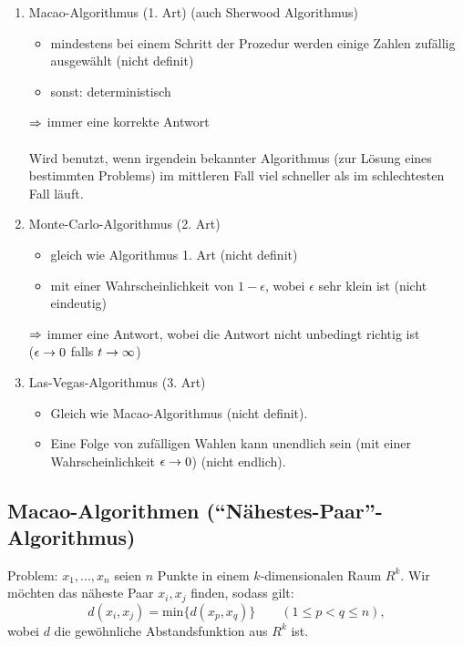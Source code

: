 \documentclass[a4paper]{scrartcl}
\begin{document}

\begin{enumerate}
\item{Macao-Algorithmus (1. Art)} (auch Sherwood Algorithmus)

\begin{itemize}
	\item mindestens bei einem Schritt der Prozedur werden einige Zahlen zufällig ausgewählt (nicht definit)
	\item sonst: deterministisch
\end{itemize}
$\Rightarrow$ immer eine korrekte Antwort\\ \\
Wird benutzt, wenn irgendein bekannter Algorithmus (zur Lösung eines bestimmten Problems) im mittleren Fall viel schneller als im schlechtesten Fall läuft.

\item{Monte-Carlo-Algorithmus (2. Art)}

\begin{itemize}
	\item gleich wie Algorithmus 1. Art (nicht definit)
	\item mit einer Wahrscheinlichkeit von $1-\epsilon$, wobei $\epsilon$ sehr klein ist (nicht eindeutig)
\end{itemize}
$\Rightarrow$ immer eine Antwort, wobei die Antwort nicht unbedingt richtig ist\\
($\epsilon \rightarrow 0$ falls $t \rightarrow \infty$)

\item{Las-Vegas-Algorithmus (3. Art)}
\begin{itemize}
	\item Gleich wie Macao-Algorithmus (nicht definit).
	\item Eine Folge von zufälligen Wahlen kann unendlich sein (mit einer Wahrscheinlichkeit $\epsilon \rightarrow 0$) (nicht endlich).
\end{itemize}
\end{enumerate}

\subsection{Macao-Algorithmen ("`Nähestes-Paar"'-Algorithmus)}

Problem: $x_1,...,x_n$ seien $n$ Punkte in einem $k$-dimensionalen Raum $R^k$.
Wir möchten das näheste Paar $x_i, x_j$ finden, sodass gilt:
$$d(x_i, x_j) = \text{min} \{d(x_p, x_q)\} \qquad (1 \leq p < q \leq n),$$
wobei $d$ die gewöhnliche Abstandsfunktion aus $R^k$ ist.
\end{document}
